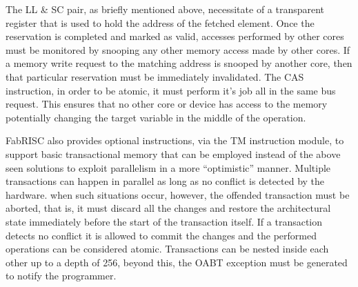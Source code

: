         The LL \& SC pair, as briefly mentioned above, necessitate of a transparent register that is used to hold the address of the fetched element. Once the reservation is completed and marked as valid, accesses performed by other cores must be monitored by snooping any other memory access made by other cores. If a memory write request to the matching address is snooped by another core, then that particular reservation must be immediately invalidated. The CAS instruction, in order to be atomic, it must perform it's job all in the same bus request. This ensures that no other core or device has access to the memory potentially changing the target variable in the middle of the operation.

        \vspace{10pt}

        FabRISC also provides optional instructions, via the TM instruction module, to support basic transactional memory that can be employed instead of the above seen solutions to exploit parallelism in a more ``optimistic'' manner. Multiple transactions can happen in parallel as long as no conflict is detected by the hardware. when such situations occur, however, the offended transaction must be aborted, that is, it must discard all the changes and restore the architectural state immediately before the start of the transaction itself. If a transaction detects no conflict it is allowed to commit the changes and the performed operations can be considered atomic. Transactions can be nested inside each other up to a depth of 256, beyond this, the OABT exception must be generated to notify the programmer.

